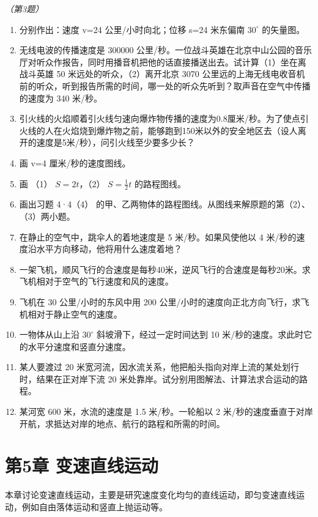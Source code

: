 \emph{（第3题）}

\begin{enumerate}
\def\labelenumi{\arabic{enumi}.}
\setcounter{enumi}{3}
\item
  分别作出：速度 v=24 公里/小时向北；位移 s=24 米东偏南 \(30^{\circ}\)
  的矢量图。
\item
  无线电波的传播速度是 300000
  公里/秒。一位战斗英雄在北京中山公园的音乐厅对听众作报告，同时用播音机把他的话直接播送出去。试计算（1）坐在离战斗英雄
  50 米远处的听众，（2）离开北京 3070
  公里远的上海无线电收音机前的听众，听到报告所需的时间，哪一处的听众先听到？取声音在空气中传播的速度为
  340 米/秒。
\item
  引火线的火焰顺着引火线匀速向爆炸物传播的速度为0.8厘米/秒。为了使点引火线的人在火焰烧到爆炸物之前，能够跑到150米以外的安全地区去（设人离开的速度是5米/秒），问引火线至少要多少长？
\item
  画 v=4 厘米/秒的速度图线。
\item
  画 （1） \(S = 2t\)，（2） \(S = \frac{1}{2} t\) 的路程图线。
\item
  画出习题 4·4（4）
  的甲、乙两物体的路程图线。从图线来解原题的第（2）、（3）两小题。
\item
  在静止的空气中，跳伞人的着地速度是 5 米/秒。如果风使他以 4
  米/秒的速度沿水平方向移动，他将用什么速度着地？
\item
  一架飞机，顺风飞行的合速度是每秒40米，逆风飞行的合速度是每秒20米。求飞机相对于空气的飞行速度和风的速度。
\item
  飞机在 30 公里/小时的东风中用 200
  公里/小时的速度向正北方向飞行，求飞机相对于静止空气的速度。
\item
  一物体从山上沿 \(30^{\circ}\) 斜坡滑下，经过一定时间达到 10
  米/秒的速度。求此时它的水平分速度和竖直分速度。
\item
  某人要渡过 20
  米宽河流，因水流关系，他把船头指向对岸上流的某处划行时，结果在正对岸下流
  20 米处靠岸。试分别用图解法、计算法求合运动的路程。
\item
  某河宽 600 米，水流的速度是 1.5 米/秒。一轮船以 2
  米/秒的速度垂直于对岸开航，求抵达对岸的地点、航行的路程和所需的时间。
\end{enumerate}

\chapter{第5章
变速直线运动}\label{ux7b2c5ux7ae0-ux53d8ux901fux76f4ux7ebfux8fd0ux52a8}

本章讨论变速直线运动，主要是研究速度变化均匀的直线运动，即匀变速直线运动，例如自由落体运动和竖直上抛运动等。

